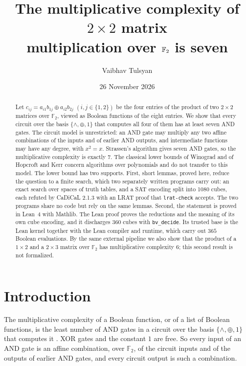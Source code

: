 \documentclass[11pt,a4paper]{article}
\title{The multiplicative complexity of $2\times 2$ matrix\\ multiplication over $\F_2$ is seven}
\author{Vaibhav Tulsyan}
\date{26 November 2026}
\theoremstyle{definition}
\newcommand{\F}{\mathbb{F}}
\newcommand{\code}[1]{\texttt{#1}}
\begin{document}
\maketitle

\begin{abstract}
Let $c_{ij}=a_{i1}b_{1j}\oplus a_{i2}b_{2j}$ $(i,j\in\{1,2\})$ be the four entries of the product of two $2\times2$ matrices over $\F_2$, viewed as Boolean functions of the eight entries. We show that every circuit over the basis $\{\wedge,\oplus,1\}$ that computes all four of them has at least seven AND gates. The circuit model is unrestricted: an AND gate may multiply any two affine combinations of the inputs and of earlier AND outputs, and intermediate functions may have any degree, with $x^2=x$. Strassen's algorithm gives seven AND gates, so the multiplicative complexity is exactly $7$. The classical lower bounds of Winograd and of Hopcroft and Kerr concern algorithms over polynomials and do not transfer to this model. The lower bound has two supports. First, short lemmas, proved here, reduce the question to a finite search, which two separately written programs carry out: an exact search over spaces of truth tables, and a SAT encoding split into 1080 cubes, each refuted by CaDiCaL 2.1.3 with an LRAT proof that \code{lrat-check} accepts. The two programs share no code but rely on the same lemmas. Second, the statement is proved in Lean~4 with Mathlib. The Lean proof proves the reductions and the meaning of its own cube encoding, and it discharges $360$ cubes with \code{bv\_decide}. Its trusted base is the Lean kernel together with the Lean compiler and runtime, which carry out $365$ Boolean evaluations. By the same external pipeline we also show that the product of a $1\times2$ and a $2\times3$ matrix over $\F_2$ has multiplicative complexity $6$; this second result is not formalized.
\end{abstract}

\section{Introduction}

The multiplicative complexity of a Boolean function, or of a list of Boolean functions, is the least number of AND gates in a circuit over the basis $\{\wedge,\oplus,1\}$ that computes it \cite{BoyarPeraltaPochuev00,BoyarFind18}. XOR gates and the constant $1$ are free. So every input of an AND gate is an affine combination, over $\F_2$, of the circuit inputs and of the outputs of earlier AND gates, and every circuit output is such a combination.
\end{document}
